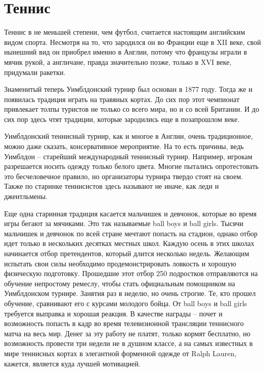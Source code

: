 \section{Теннис}

Теннис в не меньшей степени, чем футбол, считается настоящим английским видом спорта. Несмотря на то, что зародился он во Франции еще в XII веке, свой нынешний вид он приобрел именно в Англии, потому что французы играли в мячик рукой, а англичане, правда значительно позже, только в XVI веке, придумали ракетки.

Знаменитый теперь Уимблдонский турнир был основан в 1877 году. Тогда же и появилась традиция играть на травяных кортах. До сих пор этот чемпионат привлекает толпы туристов не только со всего мира, но и со всей Британии. И до сих пор здесь чтят традиции, которые зародились еще в позапрошлом веке.


 Уимблдонский теннисный турнир, как и многое в Англии, очень традиционное, можно даже сказать, консервативное мероприятие. На то есть причины, ведь Уимблдон – старейший международный теннисный турнир. Например, игрокам разрешается носить одежду только белого цвета. Многие пытались опротестовать это бесчеловечное правило, но организаторы турнира твердо стоят на своем. Также по старинке теннисистов здесь называют не иначе, как леди и джентльмены.

Еще одна старинная традиция касается мальчишек и девчонок, которые во время игры бегают за мячиками. Это так называемые ball boys и ball girls. Тысячи мальчишек и девчонок по всей стране мечтают попасть на стадион, однако отбор идет только в нескольких десятках местных школ. Каждую осень в этих школах начинается отбор претендентов, который длится несколько недель. Желающим испытать свои силы необходимо продемонстрировать ловкость и хорошую физическую подготовку. Прошедшие этот отбор 250 подростков отправляются на обучение непростому ремеслу, чтобы стать официальным помощником на Уимблдонском турнире. Занятия раз в неделю, но очень строгие. Те, кто прошел обучение, сравнивают его с курсами молодого бойца. От ball boys и ball girls требуется выправка и хорошая реакция. В качестве награды – почет и возможность попасть в кадр во время телевизионной трансляции теннисного матча на весь мир. Денег за эту работу не платят, только кормят бесплатно, но возможность провести три недели не в душном классе, а на самых известных в мире теннисных кортах в элегантной форменной одежде от Ralph Lauren, кажется, является куда лучшей мотивацией.